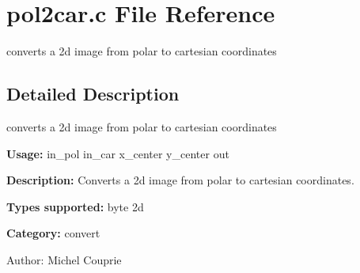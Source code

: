 \section{pol2car.c File Reference}
\label{pol2car_8c}
converts a 2d image from polar to cartesian coordinates 



\subsection{Detailed Description}
converts a 2d image from polar to cartesian coordinates 

{\bf Usage:} in\_\-pol in\_\-car x\_\-center y\_\-center out

{\bf Description:} Converts a 2d image from polar to cartesian coordinates.

{\bf Types supported:} byte 2d

{\bf Category:} convert

\begin{Desc}
\item[Author:]Michel Couprie \end{Desc}

